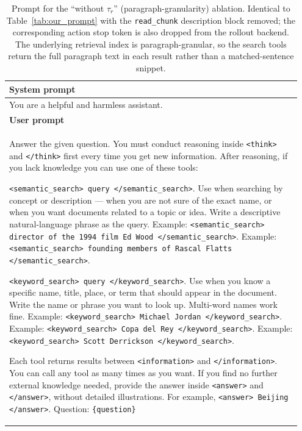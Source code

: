 \documentclass[11pt]{article}
\begin{document}
\begin{table}[t]
\centering
\small
\begin{tabular}{p{0.95\linewidth}}
\hline
\textbf{System prompt} \\
\hline
You are a helpful and harmless assistant. \\
\hline
\textbf{User prompt} \\
\hline
Answer the given question. You must conduct reasoning inside \texttt{\textless{}think\textgreater{}} and \texttt{\textless{}/think\textgreater{}} first every time you get new information. After reasoning, if you lack knowledge you can use one of these tools:

\quad \texttt{\textless{}semantic\_search\textgreater{} query \textless{}/semantic\_search\textgreater{}}.
Use when searching by concept or description --- when you are not sure of the exact name, or when you want documents related to a topic or idea. Write a descriptive natural-language phrase as the query.
Example: \texttt{\textless{}semantic\_search\textgreater{} director of the 1994 film Ed Wood \textless{}/semantic\_search\textgreater{}}.
Example: \texttt{\textless{}semantic\_search\textgreater{} founding members of Rascal Flatts \textless{}/semantic\_search\textgreater{}}.

\quad \texttt{\textless{}keyword\_search\textgreater{} query \textless{}/keyword\_search\textgreater{}}.
Use when you know a specific name, title, place, or term that should appear in the document. Write the name or phrase you want to look up. Multi-word names work fine.
Example: \texttt{\textless{}keyword\_search\textgreater{} Michael Jordan \textless{}/keyword\_search\textgreater{}}.
Example: \texttt{\textless{}keyword\_search\textgreater{} Copa del Rey \textless{}/keyword\_search\textgreater{}}.
Example: \texttt{\textless{}keyword\_search\textgreater{} Scott Derrickson \textless{}/keyword\_search\textgreater{}}.

Each tool returns results between \texttt{\textless{}information\textgreater{}} and \texttt{\textless{}/information\textgreater{}}. You can call any tool as many times as you want. If you find no further external knowledge needed, provide the answer inside \texttt{\textless{}answer\textgreater{}} and \texttt{\textless{}/answer\textgreater{}}, without detailed illustrations. For example, \texttt{\textless{}answer\textgreater{} Beijing \textless{}/answer\textgreater{}}. Question: \texttt{\{question\}} \\
\hline
\end{tabular}
\caption{Prompt for the ``without $\tau_r$'' (paragraph-granularity) ablation. Identical to Table~\ref{tab:our_prompt} with the \texttt{read\_chunk} description block removed; the corresponding action stop token is also dropped from the rollout backend. The underlying retrieval index is paragraph-granular, so the search tools return the full paragraph text in each result rather than a matched-sentence snippet.}
\label{tab:prompt_no_rc_paragraph}
\end{table}
\end{document}
